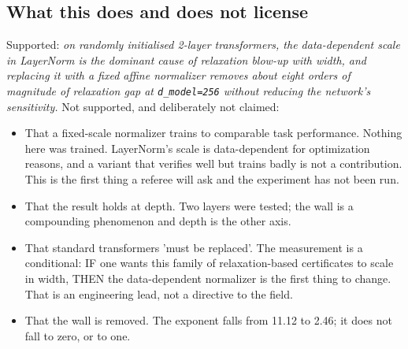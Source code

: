 \documentclass[sn-nature,pdflatex]{sn-jnl}
\begin{document}
\subsection{What this does and does not license}
Supported: \emph{on randomly initialised 2-layer transformers, the data-dependent scale in LayerNorm is the dominant cause of relaxation blow-up with width, and replacing it with a fixed affine normalizer removes about eight orders of magnitude of relaxation gap at \texttt{d\_model=256} without reducing the network's sensitivity.}
Not supported, and deliberately not claimed:
\begin{itemize}
\item That a fixed-scale normalizer trains to comparable task performance. Nothing here was trained. LayerNorm's scale is data-dependent for optimization reasons, and a variant that verifies well but trains badly is not a contribution. This is the first thing a referee will ask and the experiment has not been run.
\item That the result holds at depth. Two layers were tested; the wall is a compounding phenomenon and depth is the other axis.
\item That standard transformers 'must be replaced'. The measurement is a conditional: IF one wants this family of relaxation-based certificates to scale in width, THEN the data-dependent normalizer is the first thing to change. That is an engineering lead, not a directive to the field.
\item That the wall is removed. The exponent falls from 11.12 to 2.46; it does not fall to zero, or to one.
\end{itemize}
\end{document}
